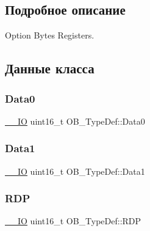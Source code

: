 \subsection{Подробное описание}
Option Bytes Registers. 

\subsection{Данные класса}
\mbox{\label{struct_o_b___type_def_a7570c0ba4b4d31c6061d595279e6b36e}} 
\subsubsection{\texorpdfstring{Data0}{Data0}}
{\footnotesize\ttfamily \mbox{\hyperlink{group___c_m_s_i_s___c_m3__core__definitions_gaec43007d9998a0a0e01faede4133d6be}{\+\_\+\+\_\+\+IO}} uint16\+\_\+t O\+B\+\_\+\+Type\+Def\+::\+Data0}

\mbox{\label{struct_o_b___type_def_a4e0e4a89db7004fb08a8a19129e9970e}} 
\subsubsection{\texorpdfstring{Data1}{Data1}}
{\footnotesize\ttfamily \mbox{\hyperlink{group___c_m_s_i_s___c_m3__core__definitions_gaec43007d9998a0a0e01faede4133d6be}{\+\_\+\+\_\+\+IO}} uint16\+\_\+t O\+B\+\_\+\+Type\+Def\+::\+Data1}

\mbox{\label{struct_o_b___type_def_ad9f9ae594003c39cc27f147e29a130bb}} 
\subsubsection{\texorpdfstring{RDP}{RDP}}
{\footnotesize\ttfamily \mbox{\hyperlink{group___c_m_s_i_s___c_m3__core__definitions_gaec43007d9998a0a0e01faede4133d6be}{\+\_\+\+\_\+\+IO}} uint16\+\_\+t O\+B\+\_\+\+Type\+Def\+::\+R\+DP}

\mbox{\label{struct_o_b___type_def_ab0292062a80446c97dac24604bd8ed8e}} 
